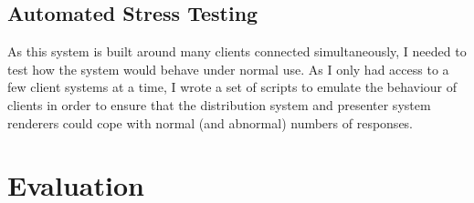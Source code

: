 \documentclass[a4papert,11pt,notitlepage]{ltxdoc}
\begin{document}

\subsection{Automated Stress Testing}
As this system is built around many clients connected simultaneously, I needed to test how the system would behave under normal use. As I only had access to a few client systems at a time, I wrote a set of scripts to emulate the behaviour of clients in order to ensure that the distribution system and presenter system renderers could cope with normal (and abnormal) numbers of responses.

\section{Evaluation}


\end{document}
